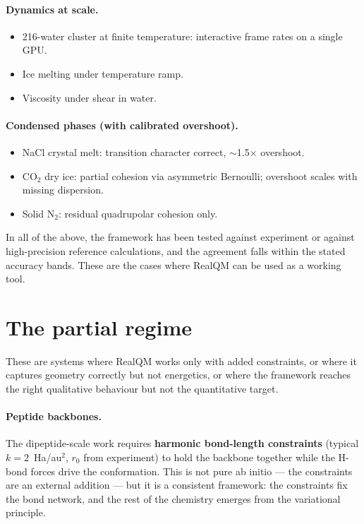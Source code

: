 \paragraph{Dynamics at scale.}
\begin{itemize}
\item 216-water cluster at finite temperature: interactive frame rates on a single GPU.
\item Ice melting under temperature ramp.
\item Viscosity under shear in water.
\end{itemize}

\paragraph{Condensed phases (with calibrated overshoot).}
\begin{itemize}
\item NaCl crystal melt: transition character correct, $\sim$1.5$\times$ overshoot.
\item CO$_2$ dry ice: partial cohesion via asymmetric Bernoulli; overshoot scales with missing dispersion.
\item Solid N$_2$: residual quadrupolar cohesion only.
\end{itemize}

In all of the above, the framework has been tested against experiment or against high-precision reference calculations, and the agreement falls within the stated accuracy bands. These are the cases where RealQM can be used as a working tool.

\section{The partial regime}\label{sec:partial-regime}

These are systems where RealQM works only with added constraints, or where it captures geometry correctly but not energetics, or where the framework reaches the right qualitative behaviour but not the quantitative target.

\paragraph{Peptide backbones.}
The dipeptide-scale work requires \textbf{harmonic bond-length constraints} (typical $k = 2$~Ha/au$^2$, $r_0$ from experiment) to hold the backbone together while the H-bond forces drive the conformation. This is not pure ab initio --- the constraints are an external addition --- but it is a consistent framework: the constraints fix the bond network, and the rest of the chemistry emerges from the variational principle.


